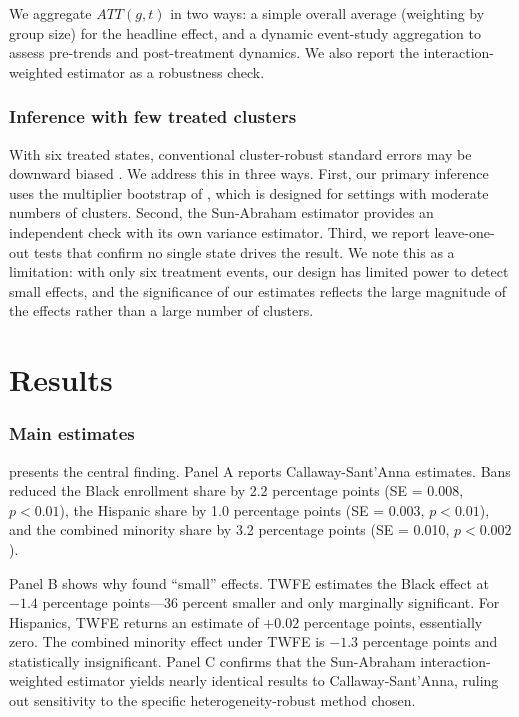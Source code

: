 \documentclass[12pt]{article}
\begin{document}
We aggregate $ATT(g,t)$ in two ways: a simple overall average (weighting by group size) for the headline effect, and a dynamic event-study aggregation to assess pre-trends and post-treatment dynamics. We also report the \citet{sun2021estimating} interaction-weighted estimator as a robustness check.

\subsubsection*{Inference with few treated clusters} With six treated states, conventional cluster-robust standard errors may be downward biased \citep{cameron2008bootstrap}. We address this in three ways. First, our primary inference uses the multiplier bootstrap of \citet{callaway2021difference}, which is designed for settings with moderate numbers of clusters. Second, the Sun-Abraham estimator provides an independent check with its own variance estimator. Third, we report leave-one-out tests that confirm no single state drives the result. We note this as a limitation: with only six treatment events, our design has limited power to detect small effects, and the significance of our estimates reflects the large magnitude of the effects rather than a large number of clusters.


\section{Results}
\label{sec:results}

\subsubsection*{Main estimates}  presents the central finding. Panel A reports Callaway-Sant'Anna estimates. Bans reduced the Black enrollment share by 2.2 percentage points (SE = 0.008, $p < 0.01$), the Hispanic share by 1.0 percentage points (SE = 0.003, $p < 0.01$), and the combined minority share by 3.2 percentage points (SE = 0.010, $p < 0.002$).

Panel B shows why \citet{hinrichs2012impact} found ``small'' effects. TWFE estimates the Black effect at $-1.4$ percentage points---36 percent smaller and only marginally significant. For Hispanics, TWFE returns an estimate of $+0.02$ percentage points, essentially zero. The combined minority effect under TWFE is $-1.3$ percentage points and statistically insignificant. Panel C confirms that the Sun-Abraham interaction-weighted estimator yields nearly identical results to Callaway-Sant'Anna, ruling out sensitivity to the specific heterogeneity-robust method chosen.
\end{document}
